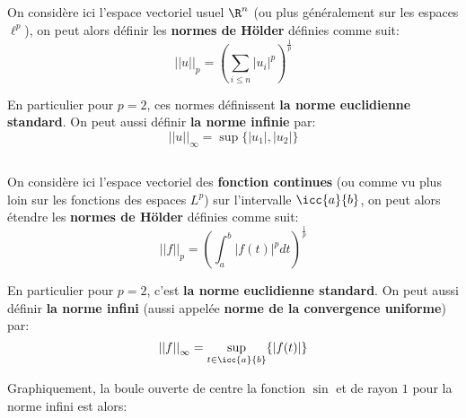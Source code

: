\subsection*{}
On considère ici l'espace vectoriel usuel \(\R^n\) (ou plus généralement sur les espaces \( \ell^p \)), on peut alors définir les \textbf{normes de Hölder} définies comme suit:
\[ 
   {||u||}_p = \left(\sum_{i \leq n} |u_i|^p \right)^{\frac{1}{p}}
\]

En particulier pour \(p=2\), ces normes définissent \textbf{la norme euclidienne standard}. On peut aussi définir \textbf{la norme infinie} par:
\[ 
   {||u||}_\infty = \sup\{|u_1|, |u_2|\}
\]
\subsection*{}
On considère ici l'espace vectoriel des \textbf{fonction continues} (ou comme vu plus loin sur les fonctions des espaces \( L^p \)) sur l'intervalle \(\icc{a}{b}\), on peut alors étendre les \textbf{normes de Hölder} définies comme suit:
\[ 
   {||f||}_p = \left (\int_{a}^{b} |f(t)|^p dt \right)^{\frac{1}{p}}
\]

En particulier pour \(p=2\), c'est \textbf{la norme euclidienne standard}. On peut aussi définir \textbf{la norme infini} (aussi appelée \textbf{norme de la convergence uniforme}) par:
\[ 
   {||f||}_\infty = \underset{t\in \icc{a}{b}}{\sup}\{|f(t)|\}
\]

Graphiquement, la boule ouverte de centre la fonction \(\sin\) et de rayon \(1\) pour la norme infini est alors:\<

\begin{center}
\end{center}
